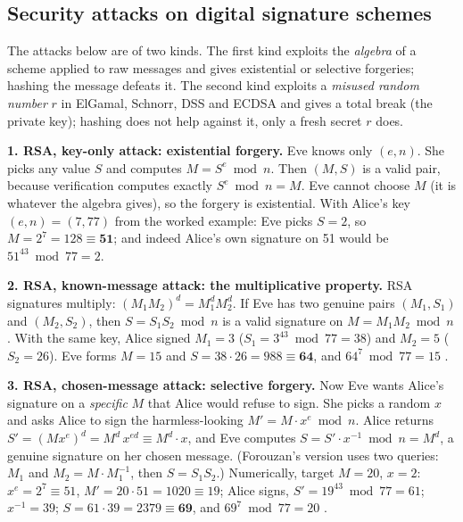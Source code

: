 \subsection{Security attacks on digital signature schemes \new}\label{sec:dsig-attacks}

The attacks below are of two kinds. The first kind exploits the \emph{algebra} of a scheme applied to raw messages and gives existential or selective forgeries; hashing the message defeats it. The second kind exploits a \emph{misused random number} $r$ in ElGamal, Schnorr, DSS and ECDSA and gives a total break (the private key); hashing does not help against it, only a fresh secret $r$ does.

\textbf{1. RSA, key-only attack: existential forgery.} Eve knows only $(e, n)$. She picks any value $S$ and computes $M = S^e \bmod n$. Then $(M, S)$ is a valid pair, because verification computes exactly $S^e \bmod n = M$. Eve cannot choose $M$ (it is whatever the algebra gives), so the forgery is existential. With Alice's key $(e, n) = (7, 77)$ from the worked example: Eve picks $S = 2$, so $M = 2^7 = 128 \equiv \mathbf{51}$; and indeed Alice's own signature on 51 would be $51^{43} \bmod 77 = 2$.

\textbf{2. RSA, known-message attack: the multiplicative property.} RSA signatures multiply: $(M_1 M_2)^d = M_1^d M_2^d$. If Eve has two genuine pairs $(M_1, S_1)$ and $(M_2, S_2)$, then $S = S_1 S_2 \bmod n$ is a valid signature on $M = M_1 M_2 \bmod n$. With the same key, Alice signed $M_1 = 3$ ($S_1 = 3^{43} \bmod 77 = 38$) and $M_2 = 5$ ($S_2 = 26$). Eve forms $M = 15$ and $S = 38 \cdot 26 = 988 \equiv \mathbf{64}$, and $64^7 \bmod 77 = 15$ \checkmark.

\textbf{3. RSA, chosen-message attack: selective forgery.} Now Eve wants Alice's signature on a \emph{specific} $M$ that Alice would refuse to sign. She picks a random $x$ and asks Alice to sign the harmless-looking $M' = M \cdot x^e \bmod n$. Alice returns $S' = (M x^e)^d = M^d\, x^{ed} \equiv M^d \cdot x$, and Eve computes $S = S' \cdot x^{-1} \bmod n = M^d$, a genuine signature on her chosen message. (Forouzan's version uses two queries: $M_1$ and $M_2 = M \cdot M_1^{-1}$, then $S = S_1 S_2$.) Numerically, target $M = 20$, $x = 2$: $x^e = 2^7 \equiv 51$, $M' = 20 \cdot 51 = 1020 \equiv 19$; Alice signs, $S' = 19^{43} \bmod 77 = 61$; $x^{-1} = 39$; $S = 61 \cdot 39 = 2379 \equiv \mathbf{69}$, and $69^7 \bmod 77 = 20$ \checkmark.

